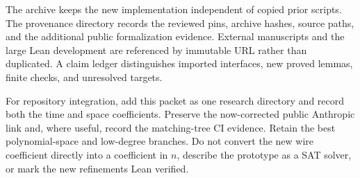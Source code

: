 The archive keeps the new implementation independent of copied prior
scripts. The provenance directory records the reviewed pins, archive hashes,
source paths, and the additional public formalization evidence. External
manuscripts and the large Lean development are referenced by immutable URL
rather than duplicated. A claim ledger distinguishes imported interfaces,
new proved lemmas, finite checks, and unresolved targets.

For repository integration, add this packet as one research directory and
record both the time and space coefficients. Preserve the now-corrected
public Anthropic link and, where useful, record the matching-tree CI
evidence. Retain the best polynomial-space and
low-degree branches. Do not convert the new wire coefficient directly into
a coefficient in $n$, describe the prototype as a SAT solver, or mark the
new refinements Lean verified.

